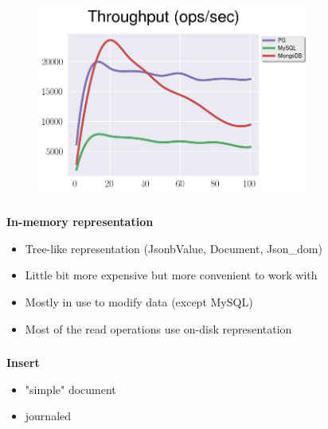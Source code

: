 \documentclass[usenames,dvipsnames, 18pt, compress, aspectratio=169]{beamer}
\begin{document}
\begin{frame}
    \frametitle{}
    \begin{center}
    \vspace{10pt}
    \begin{figure}
        \includegraphics[width=0.8\textwidth,center]{benchmarks/select_jsonb_path_ops_no_parse_throughput.png}
    \end{figure}
    \end{center}
\end{frame}

\begin{frame}
    \frametitle{}
    \textbf{In-memory representation}
    \begin{center}
        \begin{itemize}[label={\MVRightarrow}]
            \item Tree-like representation (JsonbValue, Document, Json\_dom)
            \item Little bit more expensive but more convenient to work with
            \item Mostly in use to modify data (except MySQL)
            \item Most of the read operations use on-disk representation
        \end{itemize}
    \end{center}
\end{frame}

\begin{frame}
    \frametitle{}
    \begin{center}
        \textbf{Insert}
        \begin{itemize}[label={}]
            \item "simple" document
            \item journaled
        \end{itemize}
    \end{center}
\end{frame}
\end{document}
